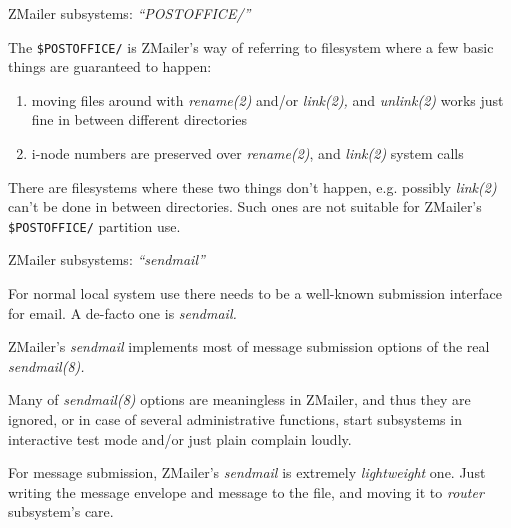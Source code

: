 \documentclass[a4paper,landscape]{slides}
\newcommand{\ZM}{ZMailer}
\begin{document}
\begin{slide}

\centerline{\large \ZM{} subsystems: {\it ``POSTOFFICE/''}}

The \verb!$POSTOFFICE/! is \ZM{}'s way of referring to filesystem
where a few basic things are guaranteed to happen:
\begin{enumerate}
\item moving files around with {\it rename(2)} and/or {\it link(2),} and
      {\it unlink(2)} works just fine in between different directories
\item i-node numbers are preserved over {\it rename(2)}, and {\it link(2)}
	system calls
\end{enumerate}

There are filesystems where these two things don't happen, e.g. possibly
{\it link(2)} can't be done in between directories.  Such ones are not
suitable for \ZM's \verb!$POSTOFFICE/! partition use.

\end{slide}



\begin{slide}

\centerline{\large \ZM{} subsystems: {\it ``sendmail''}}

For normal local system use there needs to be a well-known
submission interface for email.  A de-facto one is {\it sendmail.}

\ZM's {\it sendmail} implements most of message submission options
of the real {\it sendmail(8).}

Many of {\it sendmail(8)} options are meaningless in \ZM{}, and thus
they are ignored, or in case of several administrative functions,
start subsystems in interactive test mode and/or just plain complain
loudly.

For message submission, \ZM's {\it sendmail} is extremely
{\it lightweight} one.  Just writing the message envelope and
message to the file, and moving it to {\it router} subsystem's care.


\vfill

\end{slide}
\end{document}
